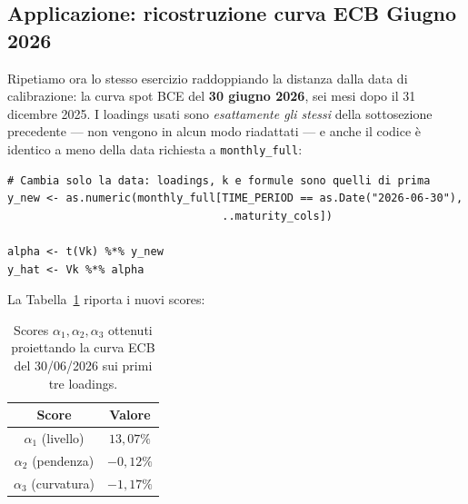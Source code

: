 \documentclass[11pt,a4paper]{article}
\theoremstyle{plain}
\theoremstyle{definition}
\theoremstyle{remark}
\begin{document}
\newpage
\subsection{Applicazione: ricostruzione curva ECB Giugno 2026}
\label{sec:target-giu26}

Ripetiamo ora lo stesso esercizio raddoppiando la distanza dalla data di
calibrazione: la curva spot BCE del \textbf{30 giugno 2026}, sei mesi dopo il
31 dicembre 2025. I loadings usati sono \emph{esattamente gli stessi} della
sottosezione precedente --- non vengono in alcun modo riadattati --- e anche
il codice è identico a meno della data richiesta a \texttt{monthly\_full}:

\begin{center}
\renewcommand{\arraystretch}{1.25}
\end{center}

\begin{codebox}
\begin{Verbatim}[fontsize=\small]
# Cambia solo la data: loadings, k e formule sono quelli di prima
y_new <- as.numeric(monthly_full[TIME_PERIOD == as.Date("2026-06-30"),
                                 ..maturity_cols])

alpha <- t(Vk) %*% y_new
y_hat <- Vk %*% alpha
\end{Verbatim}
\end{codebox}

La Tabella~\ref{tab:alpha_giu26} riporta i nuovi scores:

\begin{table}[H]
\centering
\begin{tabular}{c c}
\toprule
Score & Valore \\
\midrule
$\alpha_1$ (livello)   & $13{,}07\%$ \\
$\alpha_2$ (pendenza)  & $-0{,}12\%$ \\
$\alpha_3$ (curvatura) & $-1{,}17\%$ \\
\bottomrule
\end{tabular}
\caption{Scores $\alpha_1,\alpha_2,\alpha_3$ ottenuti proiettando la curva
ECB del 30/06/2026 sui primi tre loadings.}
\label{tab:alpha_giu26}
\end{table}
\end{document}

